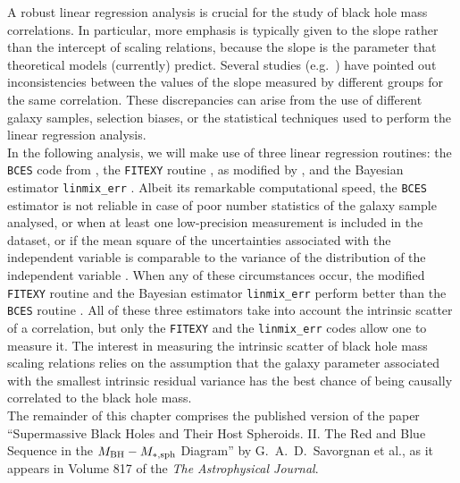A robust linear regression analysis is crucial for the study of black hole mass correlations.
In particular, more emphasis is typically given to the slope rather than the intercept of scaling relations, 
because the slope is the parameter that theoretical models (currently) predict. 
Several studies (e.g.~\citealt{tremaine2002,graham2007,tundo2007,graham2016review}) 
have pointed out inconsistencies between the values of the slope
measured by different groups for the same correlation. 
These discrepancies can arise from the use of different galaxy samples, 
selection biases, or the statistical techniques used to perform the linear regression analysis. \\

In the following analysis, we will make use of three linear regression routines: 
the {\tt BCES} code from \cite{akritasbershady1996}, 
the {\tt FITEXY} routine \citep{press1992}, as modified by \cite{tremaine2002}, 
and the Bayesian estimator {\tt linmix\_err} \citep{linmixerr}.
Albeit its remarkable computational speed, 
the {\tt BCES} estimator is not reliable in case of poor number statistics of the galaxy sample analysed, 
or when at least one low-precision measurement is included in the dataset, 
or if the mean square of the uncertainties associated with the independent variable is comparable to 
the variance of the distribution of the independent variable \citep{tremaine2002}. 
When any of these circumstances occur, 
the modified {\tt FITEXY} routine and the Bayesian estimator {\tt linmix\_err} 
perform better than the {\tt BCES} routine \citep{tremaine2002,novak2006,park2012}. 
All of these three estimators take into account the intrinsic scatter of a correlation, 
but only the {\tt FITEXY} and the {\tt linmix\_err} codes allow one to measure it. 
The interest in measuring the intrinsic scatter of black hole mass scaling relations 
relies on the assumption that 
the galaxy parameter associated with the smallest intrinsic residual variance 
has the best chance of being causally correlated to the black hole mass. \\

The remainder of this chapter comprises the published version of the paper 
``Supermassive Black Holes and Their Host Spheroids. 
II. The Red and Blue Sequence in the $M_{\rm BH} - M_{\rm *,sph}$ Diagram'' 
by G.~A.~D.~Savorgnan et al.,  
as it appears in Volume 817 of the \emph{The Astrophysical Journal}. 


